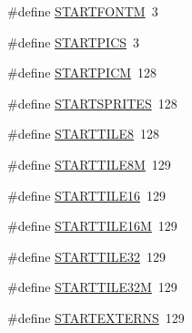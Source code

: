 \begin{DoxyCompactItemize}
\item 
\#define \hyperlink{GFXV__SDM_8H_a8e97342cc14d7aed1d20b6ff859f22ef}{STARTFONTM}~3
\item 
\#define \hyperlink{GFXV__SDM_8H_aaf17bc60cff0a0236cafed9026641531}{STARTPICS}~3
\item 
\#define \hyperlink{GFXV__SDM_8H_abd418cd2e72de01524b8400b58ad8273}{STARTPICM}~128
\item 
\#define \hyperlink{GFXV__SDM_8H_a08f15ca2b66024c7df43a601df18e33a}{STARTSPRITES}~128
\item 
\#define \hyperlink{GFXV__SDM_8H_a63a36c8955b74ee16ba0fc61f4d62478}{STARTTILE8}~128
\item 
\#define \hyperlink{GFXV__SDM_8H_a56df7bfae7e081f1fe22c67f356c0f12}{STARTTILE8M}~129
\item 
\#define \hyperlink{GFXV__SDM_8H_adde5c841b7c315dca1c114be851a14bf}{STARTTILE16}~129
\item 
\#define \hyperlink{GFXV__SDM_8H_a8158cbe2ebd8e9f311fd7637be063176}{STARTTILE16M}~129
\item 
\#define \hyperlink{GFXV__SDM_8H_afdb080cedc6a487f761df7481033e345}{STARTTILE32}~129
\item 
\#define \hyperlink{GFXV__SDM_8H_a04e773bd033b5375cb82a2bc5142eb3a}{STARTTILE32M}~129
\item 
\#define \hyperlink{GFXV__SDM_8H_a4bab9c7dbc3408ece8bf42a298f4a0ad}{STARTEXTERNS}~129
\end{DoxyCompactItemize}
